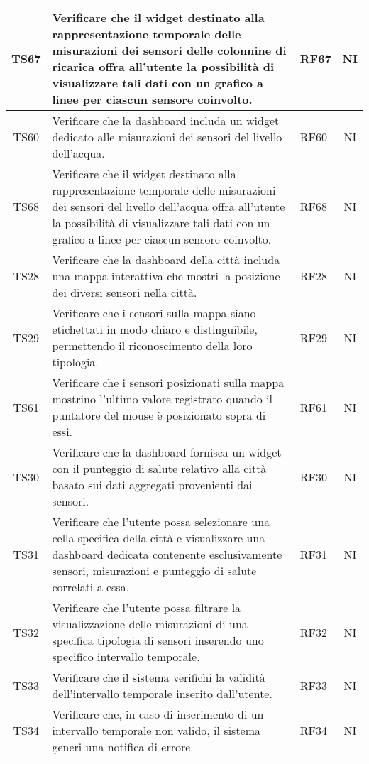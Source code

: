 \begin{longtable}{|c|p{5cm}|>{\raggedright}p{2cm}|c|}
        \hline
        TS67 & Verificare che il widget destinato alla rappresentazione temporale delle misurazioni dei sensori delle colonnine di ricarica offra all'utente la possibilità di visualizzare tali dati con un grafico a linee per ciascun sensore coinvolto. & RF67 & NI \\
        \hline
        TS60 & Verificare che la dashboard includa un widget dedicato alle misurazioni dei sensori del livello dell'acqua. & RF60 & NI \\
        \hline
        TS68 & Verificare che il widget destinato alla rappresentazione temporale delle misurazioni dei sensori del livello dell'acqua offra all'utente la possibilità di visualizzare tali dati con un grafico a linee per ciascun sensore coinvolto. & RF68 & NI \\
        \hline
        TS28 & Verificare che la dashboard della città includa una mappa interattiva che mostri la posizione dei diversi sensori nella città. & RF28 & NI \\
        \hline
        TS29 & Verificare che i sensori sulla mappa siano etichettati in modo chiaro e distinguibile, permettendo il riconoscimento della loro tipologia. & RF29 & NI \\
        \hline
        TS61 & Verificare che i sensori posizionati sulla mappa mostrino l'ultimo valore registrato quando il puntatore del mouse è posizionato sopra di essi. & RF61 & NI \\
        \hline
        TS30 & Verificare che la dashboard fornisca un widget con il punteggio di salute relativo alla città basato sui dati aggregati provenienti dai sensori. & RF30 & NI \\
        \hline
        TS31 & Verificare che l'utente possa selezionare una cella specifica della città e visualizzare una dashboard dedicata contenente esclusivamente sensori, misurazioni e punteggio di salute correlati a essa. & RF31 & NI \\
        \hline
        TS32 & Verificare che l'utente possa filtrare la visualizzazione delle misurazioni di una specifica tipologia di sensori inserendo uno specifico intervallo temporale. & RF32 & NI \\
        \hline
        TS33 & Verificare che il sistema verifichi la validità dell'intervallo temporale inserito dall'utente. & RF33 & NI \\
        \hline
        TS34 & Verificare che, in caso di inserimento di un intervallo temporale non valido, il sistema generi una notifica di errore. & RF34 & NI \\

\end{longtable}
